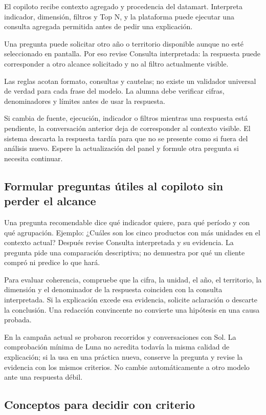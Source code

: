 El copiloto recibe contexto agregado y procedencia del datamart. Interpreta indicador, dimensión, filtros y Top N, y la plataforma puede ejecutar una consulta agregada permitida antes de pedir una explicación.

Una pregunta puede solicitar otro año o territorio disponible aunque no esté seleccionado en pantalla. Por eso revise Consulta interpretada: la respuesta puede corresponder a otro alcance solicitado y no al filtro actualmente visible.

Las reglas acotan formato, consultas y cautelas; no existe un validador universal de verdad para cada frase del modelo. La alumna debe verificar cifras, denominadores y límites antes de usar la respuesta.

Si cambia de fuente, ejecución, indicador o filtros mientras una respuesta está pendiente, la conversación anterior deja de corresponder al contexto visible. El sistema descarta la respuesta tardía para que no se presente como si fuera del análisis nuevo. Espere la actualización del panel y formule otra pregunta si necesita continuar.

\subsection{Formular preguntas útiles al copiloto sin perder el alcance}
Una pregunta recomendable dice qué indicador quiere, para qué período y con qué agrupación. Ejemplo: ¿Cuáles son los cinco productos con más unidades en el contexto actual? Después revise Consulta interpretada y su evidencia. La pregunta pide una comparación descriptiva; no demuestra por qué un cliente compró ni predice lo que hará.

Para evaluar coherencia, compruebe que la cifra, la unidad, el año, el territorio, la dimensión y el denominador de la respuesta coinciden con la consulta interpretada. Si la explicación excede esa evidencia, solicite aclaración o descarte la conclusión. Una redacción convincente no convierte una hipótesis en una causa probada.

En la campaña actual se probaron recorridos y conversaciones con Sol. La comprobación mínima de Luna no acredita todavía la misma calidad de explicación; si la usa en una práctica nueva, conserve la pregunta y revise la evidencia con los mismos criterios. No cambie automáticamente a otro modelo ante una respuesta débil.

\subsection{Conceptos para decidir con criterio}
